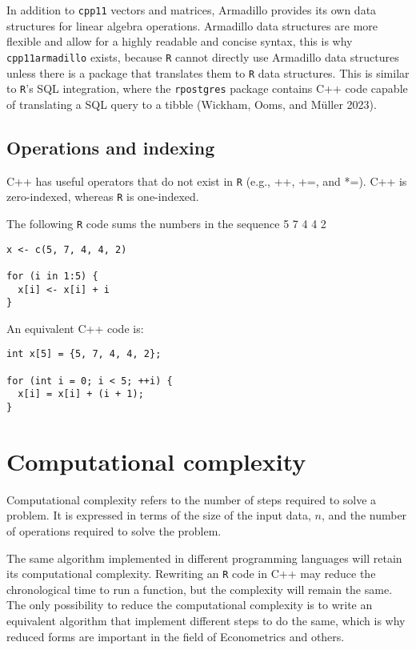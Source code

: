 In addition to \texttt{cpp11} vectors and matrices, Armadillo provides its own data
structures for linear algebra operations. Armadillo data structures are more
flexible and allow for a highly readable and concise syntax, this is why
\texttt{cpp11armadillo} exists, because \texttt{R} cannot directly use Armadillo data structures
unless there is a package that translates them to \texttt{R} data structures. This is
similar to \texttt{R}'s SQL integration, where the \texttt{rpostgres} package contains C++
code capable of translating a SQL query to a tibble (Wickham, Ooms, and Müller 2023).

\hypertarget{operations-and-indexing}{%
\subsection{Operations and indexing}\label{operations-and-indexing}}

C++ has useful operators that do not exist in \texttt{R} (e.g., ++, +=, and *=).
C++ is zero-indexed, whereas \texttt{R} is one-indexed.

The following \texttt{R} code sums the numbers in the sequence 5 7 4 4 2

\begin{verbatim}
x <- c(5, 7, 4, 4, 2)

for (i in 1:5) {
  x[i] <- x[i] + i
}
\end{verbatim}

An equivalent C++ code is:

\begin{verbatim}
int x[5] = {5, 7, 4, 4, 2};

for (int i = 0; i < 5; ++i) {
  x[i] = x[i] + (i + 1);
}
\end{verbatim}

\hypertarget{computational-complexity}{%
\section{Computational complexity}\label{computational-complexity}}

Computational complexity refers to the number of steps required to solve a
problem. It is expressed in terms of the size of the input data, \(n\), and the
number of operations required to solve the problem.

The same algorithm implemented in different programming languages will retain
its computational complexity. Rewriting an \texttt{R} code in C++ may reduce the
chronological time to run a function, but the complexity will remain the same.
The only possibility to reduce the computational complexity is to write an
equivalent algorithm that implement different steps to do the same, which is
why reduced forms are important in the field of Econometrics and others.

